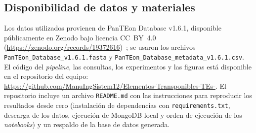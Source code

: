 
\subsection*{Disponibilidad de datos y materiales}

{\sloppy
Los datos utilizados provienen de PanTEon Database v1.6.1, disponible
públicamente en Zenodo bajo licencia CC~BY~4.0
(\url{https://zenodo.org/records/19372616})~\cite{panteon2026zenodo};
se usaron los archivos \texttt{PanTEon\_Database\_v1.6.1.fasta} y
\texttt{PanTEon\_Database\_metadata\_v1.6.1.csv}. El código del
\textit{pipeline}, las consultas, los experimentos y las figuras está
disponible en el repositorio del equipo:\\
\url{https://github.com/ManuIngSistem12/Elementos-Transponibles-TEs-}.
El repositorio incluye un archivo \texttt{README.md} con las
instrucciones para reproducir los resultados desde cero (instalación de
dependencias con \texttt{requirements.txt}, descarga de los datos,
ejecución de MongoDB local y orden de ejecución de los
\textit{notebooks}) y un respaldo de la base de datos generada.\par}